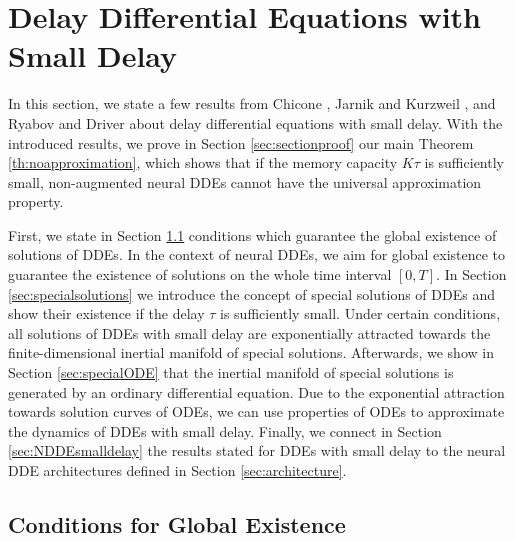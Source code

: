\documentclass[10pt]{article}
\numberwithin{equation}{section}
\begin{document}
	
	
	\section{Delay Differential Equations with Small Delay}
	\label{sec:dde_small_delay}
	
	In this section, we state a few results from Chicone \cite{Chicone2003}, Jarnik and Kurzweil \cite{Jarnik1975}, and Ryabov and Driver \cite{Driver1962,Driver1968} about delay differential equations with small delay. With the introduced results, we prove in Section \ref{sec:sectionproof} our main Theorem \ref{th:noapproximation}, which shows that if the memory capacity $K \tau$  is sufficiently small, non-augmented neural DDEs cannot have the universal approximation property.
	
	First, we state in Section \ref{sec:globalexistence} conditions which guarantee the global existence of solutions of DDEs. In the context of neural DDEs, we aim for global existence to guarantee the existence of solutions on the whole time interval $[0,T]$. In Section \ref{sec:specialsolutions} we introduce the concept of special solutions of DDEs and show their existence if the delay $\tau$ is sufficiently small. Under certain conditions, all solutions of DDEs with small delay are exponentially attracted towards the finite-dimensional inertial manifold of special solutions. Afterwards, we show in Section \ref{sec:specialODE} that the inertial manifold of special solutions is generated by an ordinary differential equation. Due to the exponential attraction towards solution curves of ODEs, we can use properties of ODEs to approximate the dynamics of DDEs with small delay. Finally, we connect in Section \ref{sec:NDDEsmalldelay} the results stated for DDEs with small delay to the neural DDE architectures defined in Section \ref{sec:architecture}. 
	
	\subsection{Conditions for Global Existence}
	\label{sec:globalexistence}
	
\end{document}
